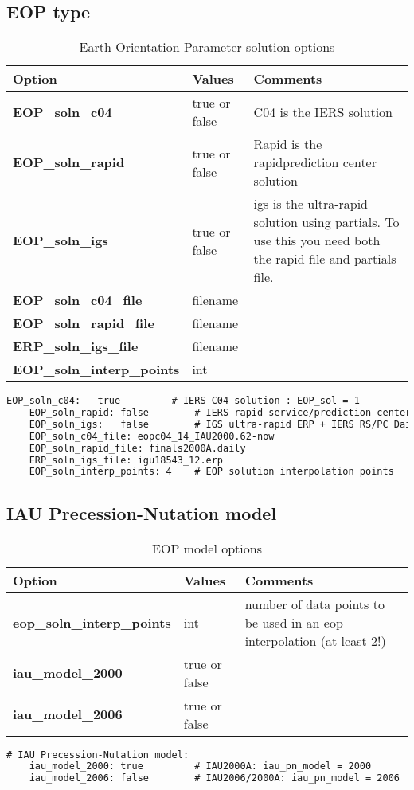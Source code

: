 \subsection{EOP type}
\begin{table}[h!]
	\begin{tabular}{|p{4.5cm}|p{2cm}|p{3.5cm}|}
		\hline
		Option & Values & Comments \\
		\hline
		\textbf{EOP\_soln\_c04} & true or false & C04 is the IERS solution\\
		\textbf{EOP\_soln\_rapid} & true or false & Rapid is the rapid\/prediction center solution\\
		\textbf{EOP\_soln\_igs} & true or false & igs is the ultra-rapid solution using partials. To use this you need both the rapid file and partials file.\\
		\textbf{EOP\_soln\_c04\_file} & filename & \\
		\textbf{EOP\_soln\_rapid\_file} & filename & \\
		\textbf{ERP\_soln\_igs\_file} & filename & \\
		\textbf{EOP\_soln\_interp\_points} & int & \\
		\hline
	\end{tabular}
	\caption{Earth Orientation Parameter solution options}
	\label{table:yaml_eop_sol}
\end{table}
%
{\small
\begin{lstlisting}[language=xml,caption=eop estimation options]
   	EOP_soln_c04:   true         # IERS C04 solution : EOP_sol = 1
	EOP_soln_rapid: false        # IERS rapid service/prediction center (RS/PC) Daily : EOP_sol = 2
	EOP_soln_igs:   false        # IGS ultra-rapid ERP + IERS RS/PC Daily (dX,dY) : EOP_sol = 3. Need both rapid_file AND igs_file
	EOP_soln_c04_file: eopc04_14_IAU2000.62-now
	EOP_soln_rapid_file: finals2000A.daily
	ERP_soln_igs_file: igu18543_12.erp
	EOP_soln_interp_points: 4    # EOP solution interpolation points
\end{lstlisting}
}
%
\subsection{IAU Precession-Nutation model}
\begin{table}[h!]
	\begin{tabular}{|p{4.5cm}|p{2cm}|p{3.5cm}|}
		\hline
		Option & Values & Comments \\
		\hline
        \textbf{eop\_soln\_interp\_points} & int & number of data points to be used in an eop interpolation (at least 2!)\\
        \textbf{iau\_model\_2000} & true or false & \\
        \textbf{iau\_model\_2006} & true or false & \\
		\hline
	\end{tabular}
	\caption{EOP model options}
	\label{table:yaml}
\end{table}
%
{\small
	\begin{lstlisting}[language=xml,caption=eop model]
	# IAU Precession-Nutation model:
	iau_model_2000: true         # IAU2000A: iau_pn_model = 2000
	iau_model_2006: false        # IAU2006/2000A: iau_pn_model = 2006
	\end{lstlisting}
}
%
